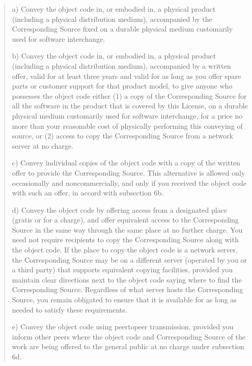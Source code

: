 \documentclass[letterpaper,10pt,english]{sphinxmanual}
\begin{document}
\begin{quote}

\sphinxAtStartPar
a) Convey the object code in, or embodied in, a physical product
(including a physical distribution medium), accompanied by the
Corresponding Source fixed on a durable physical medium
customarily used for software interchange.

\sphinxAtStartPar
b) Convey the object code in, or embodied in, a physical product
(including a physical distribution medium), accompanied by a
written offer, valid for at least three years and valid for as
long as you offer spare parts or customer support for that product
model, to give anyone who possesses the object code either (1) a
copy of the Corresponding Source for all the software in the
product that is covered by this License, on a durable physical
medium customarily used for software interchange, for a price no
more than your reasonable cost of physically performing this
conveying of source, or (2) access to copy the
Corresponding Source from a network server at no charge.

\sphinxAtStartPar
c) Convey individual copies of the object code with a copy of the
written offer to provide the Corresponding Source.  This
alternative is allowed only occasionally and noncommercially, and
only if you received the object code with such an offer, in accord
with subsection 6b.

\sphinxAtStartPar
d) Convey the object code by offering access from a designated
place (gratis or for a charge), and offer equivalent access to the
Corresponding Source in the same way through the same place at no
further charge.  You need not require recipients to copy the
Corresponding Source along with the object code.  If the place to
copy the object code is a network server, the Corresponding Source
may be on a different server (operated by you or a third party)
that supports equivalent copying facilities, provided you maintain
clear directions next to the object code saying where to find the
Corresponding Source.  Regardless of what server hosts the
Corresponding Source, you remain obligated to ensure that it is
available for as long as needed to satisfy these requirements.

\sphinxAtStartPar
e) Convey the object code using peer\sphinxhyphen{}to\sphinxhyphen{}peer transmission, provided
you inform other peers where the object code and Corresponding
Source of the work are being offered to the general public at no
charge under subsection 6d.
\end{quote}
\end{document}
